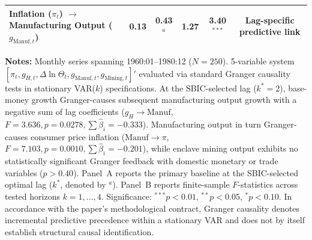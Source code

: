 \begin{table}[htbp]
{\begin{tabular}{llccccc}
Inflation ($\pi_t$) $\to$ Manufacturing Output ($g_{\text{Manuf},t}$) & 0.13 & 0.43$^a$ & 1.27 & 3.40$^{***}$ & \multicolumn{2}{c}{Lag-specific predictive link} \\
\bottomrule
\end{tabular}%
}
\begin{minipage}{0.96\textwidth}
\vspace{0.3em}
\footnotesize \textbf{Notes:} Monthly series spanning 1960:01--1980:12 ($N=250$). 5-variable system $[\pi_t, g_{H,t}, \Delta \ln \Theta_t, g_{\text{Manuf},t}, g_{\text{Mining},t}]'$ evaluated via standard Granger causality tests in stationary VAR($k$) specifications. At the SBIC-selected lag ($k^*=2$), base-money growth Granger-causes subsequent manufacturing output growth with a negative sum of lag coefficients ($g_H \to \text{Manuf}$, $F = 3.636, p = 0.0278, \sum \hat{\beta}_i = -0.333$). Manufacturing output in turn Granger-causes consumer price inflation ($\text{Manuf} \to \pi$, $F = 7.103, p = 0.0010, \sum \hat{\beta}_i = -0.201$), while enclave mining output exhibits no statistically significant Granger feedback with domestic monetary or trade variables ($p > 0.40$). Panel~A reports the primary baseline at the SBIC-selected optimal lag ($k^*$, denoted by $^a$). Panel~B reports finite-sample $F$-statistics across tested horizons $k = 1, \dots, 4$. Significance: $^{***} p < 0.01$, $^{**} p < 0.05$, $^{*} p < 0.10$. In accordance with the paper's methodological contract, Granger causality denotes incremental predictive precedence within a stationary VAR and does not by itself establish structural causal identification.
\end{minipage}
\end{table}
